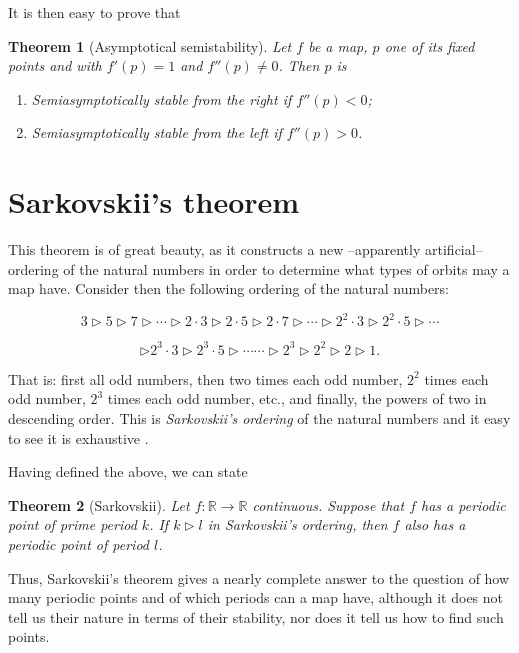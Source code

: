 \documentclass[10pt,twoside,titlepage]{book}
\numberwithin{equation}{chapter}
\numberwithin{figure}{chapter}
\numberwithin{table}{chapter}
\theoremstyle{plain}%
\newtheorem{thm}{Theorem}[chapter]
\theoremstyle{definition}
\theoremstyle{remark}
\begin{document}
It is then easy to prove that

\begin{thm} [Asymptotical semistability]
	\label{thm:semistability}
	Let $f$ be a map, $p$ one of its fixed points and with $f'(p)=1$ and $f''(p)\neq0$. Then $p$ is
	\begin{enumerate}
		\item Semiasymptotically stable from the right if $f''(p)<0$;
		\item Semiasymptotically stable from the left if $f''(p)>0$.
	\end{enumerate}
\end{thm}

\section{Sarkovskii's theorem}
\label{sec:Sarkovskii}

This theorem is of great beauty, as it constructs a new --apparently artificial-- ordering of the natural numbers in order to determine what types of orbits may a map have. Consider then the following ordering of the natural numbers:

\[3\triangleright5\triangleright7\triangleright\cdots\triangleright2\cdot3\triangleright2\cdot5\triangleright2\cdot7\triangleright\cdots\triangleright2^{2}\cdot3\triangleright2^{2}\cdot5\triangleright\cdots\]

\[\triangleright2^{3}\cdot3\triangleright2^{3}\cdot5\triangleright\cdots\cdots\triangleright2^{3}\triangleright2^{2}\triangleright2\triangleright1.\]

That is: first all odd numbers, then two times each odd number, $2^{2}$ times each odd number, $2^{3}$ times each odd number, etc., and finally, the powers of two in descending order. This is \emph{Sarkovskii's ordering} of the natural numbers and it easy to see it is exhaustive .

Having defined the above, we can state

\begin{thm}[Sarkovskii]
	Let $f:\mathbb{R}\rightarrow\mathbb{R}$ continuous. Suppose that $f$ has a periodic point of prime period $k$. If $k\triangleright l$ in Sarkovskii's ordering, then $f$ also has a periodic point of period $l$.
\end{thm}

Thus, Sarkovskii's theorem gives a nearly complete answer to the question of how many periodic points and of which periods can a map have, although it does not tell us their nature in terms of their stability, nor does it tell us how to find such points.
\end{document}
